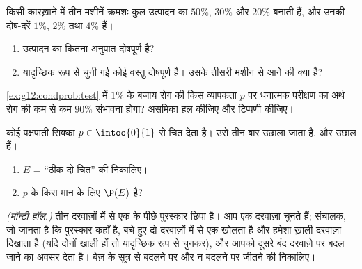 \begin{exercise}[$\star\star$]\label{exo:g12:condprob:4}
किसी कारख़ाने में तीन मशीनें क्रमशः कुल उत्पादन का $50\%$, $30\%$ और $20\%$ बनाती
हैं, और उनकी दोष-दरें $1\%$, $2\%$ तथा $4\%$ हैं।
\begin{enumerate}
  \item उत्पादन का कितना अनुपात दोषपूर्ण है?
  \item यादृच्छिक रूप से चुनी गई कोई वस्तु दोषपूर्ण है। उसके तीसरी मशीन से
        आने की  क्या है?
\end{enumerate}
\end{exercise}

\begin{exercise}[$\star\star$]\label{exo:g12:condprob:5}
\cref{ex:g12:condprob:test} में $1\%$ के बजाय रोग की किस व्यापकता $p$ पर धनात्मक परीक्षण का अर्थ
रोग की कम से कम $90\%$ संभावना होगा? असमिका हल कीजिए और टिप्पणी कीजिए।
\end{exercise}

\begin{exercise}[$\star\star$]\label{exo:g12:condprob:6}
कोई पक्षपाती सिक्का  $p \in \intoo{0}{1}$ से चित देता है। उसे तीन बार उछाला जाता
है, और उछाल  हैं।
\begin{enumerate}
  \item {} $E$ = ``ठीक दो चित'' की  निकालिए।
  \item $p$ के किस मान के लिए $\P(E)$  है?
\end{enumerate}
\end{exercise}

\begin{exercise}[$\star\star\star$]\label{exo:g12:condprob:7}
\emph{(मॉन्टी हॉल.)} तीन दरवाज़ों में से एक के पीछे पुरस्कार छिपा है। आप एक
दरवाज़ा चुनते हैं; संचालक, जो जानता है कि पुरस्कार कहाँ है, बचे हुए दो
दरवाज़ों में से एक खोलता है और हमेशा ख़ाली दरवाज़ा दिखाता है (यदि दोनों ख़ाली
हों तो यादृच्छिक रूप से चुनकर), और आपको दूसरे बंद दरवाज़े पर बदल जाने का
अवसर देता है। बेज़ के सूत्र से बदलने पर और न बदलने पर जीतने की 
निकालिए।
\end{exercise}

